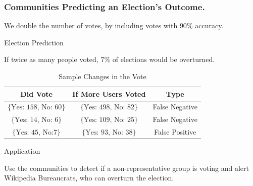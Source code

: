 \documentclass{beamer}
\begin{document}
\begin{frame}\frametitle{Communities Predicting an Election's Outcome.}
We double the number of votes, by including votes with $90\%$ accuracy. \newline

\begin{block}{Election Prediction}
\begin{center}
If twice as many people voted, $7\%$ of elections would be overturned.
\end{center}
\end{block}

\begin{table}[t]
\centering
\begin{tabular}{ccc}
Did Vote & If More Users Voted & Type\\ \hline
$\{ \mbox{Yes: 158, No: 60}\}$ & $\{ \mbox{Yes: 498, No: 82}\}$ & False Negative \\
$\{ \mbox{Yes: 14, No: 6}\}$ & $\{ \mbox{Yes: 109, No: 25}\}$ & False Negative\\
$\{ \mbox{Yes: 45, No:7}\}$ & $\{ \mbox{Yes: 93, No: 38}\}$ & False Positive\\
\end{tabular}
\caption{Sample Changes in the Vote}
\end{table}
\begin{block}{Application}
\begin{center}
Use the communities to detect if a non-representative group is voting and alert Wikipedia Bureaucrats, who can overturn the election.
\end{center}
\end{block}

\end{frame}
\end{document}

